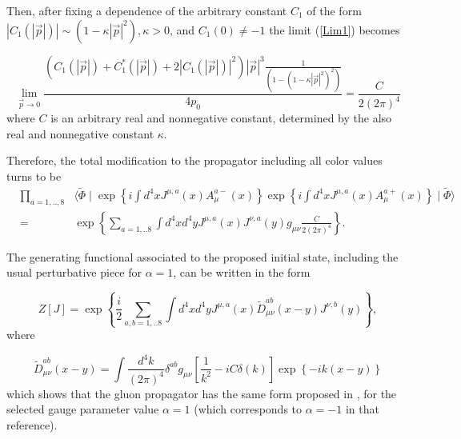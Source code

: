 \documentclass[12pt,letterpaper]{report}
\begin{document}
Then, after fixing a dependence of the arbitrary constant $C_1$ of
the form $ \left| C_1\left(\left| \vec{p}\right| \right) \right|
\sim \left(1-\kappa \left| \vec{p}\right| ^2\right),\kappa >0$,
and $C_1\left(0\right) \neq -1$ the limit (\ref{Lim1}) becomes

\begin{equation}
\lim_{\vec{p}\rightarrow 0}\frac{\left(C_1\left(\left|
\vec{p}\right| \right) +C_1^{*}\left(\left| \vec{p}\right| \right)
+2\left| C_1\left(\left| \vec{p}\right| \right) \right| ^2\right)
\left| \vec{p}\right| ^3\frac 1{\left(1-\left(1-\kappa \left|
\vec{p}\right| ^2\right) ^2\right) }}{4p_0}=\frac C{2\left(2\pi
\right) ^4}
\end{equation}
where $C$ is an arbitrary real and nonnegative constant,
determined by the also real and nonnegative constant $\kappa$.

Therefore, the total modification to the propagator including all
color values turns to be {\setlength\arraycolsep{0.5pt}
\begin{eqnarray}
&\prod\limits_{a=1,..,8}&\langle \widetilde{\Phi }\mid \exp
\left\{ i\int d^4xJ^{\mu,a}\left(x\right) A_\mu ^{a-}\left(
x\right) \right\} \exp \left\{ i\int d^4xJ^{\mu,a}\left(x\right)
A_\mu ^{a+}\left(x\right) \right\} \mid \widetilde{\Phi }\rangle
\nonumber \\ &=&\exp \left\{ \sum\limits_{a=1,..8}\int
d^4xd^4yJ^{\mu,a}\left(x\right) J^{\nu,a}\left(y\right) g_{\mu \nu
}\frac C{2\left(2\pi \right) ^4}\right\}.
\end{eqnarray}}

The generating functional associated to the proposed initial
state, including the usual perturbative piece for $\alpha =1$, can
be written in the form

\begin{equation}
Z[J]=\exp \left\{ \frac i2\sum\limits_{a,b=1,..8}\int
d^4xd^4yJ^{\mu,a}\left(x\right) \widetilde{D}_{\mu \nu
}^{ab}(x-y)J^{\nu,b}\left(y\right) \right\},
\end{equation}
where

\begin{equation}
\widetilde{D}_{\mu \nu }^{ab}(x-y)=\int \frac{d^4k}{\left(2\pi
\right) ^4} \delta ^{ab}g_{\mu \nu }\left[ \frac 1{k^2}-iC\delta
\left(k\right) \right] \exp \left\{ -ik\left(x-y\right) \right\}
\label{propag}
\end{equation}
which shows that the gluon propagator has the same form proposed
in \cite{Cabo}, for the selected gauge parameter value $\alpha =1$
(which corresponds to $\alpha =-1$ in that reference).
\end{document}
